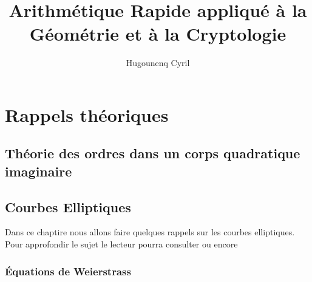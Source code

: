\documentclass[10pt,a4paper]{book}
\author{Hugounenq Cyril}
\title{Arithmétique Rapide appliqué à la Géométrie et à la Cryptologie}
\theoremstyle{plain}
\theoremstyle{definition}
\theoremstyle{definition}
\theoremstyle{definition}
\theoremstyle{definition}
\theoremstyle{remark}
\theoremstyle{remark}
\begin{document}
\fancyhf{}%
\fancyhead[L]{\nouppercase\leftmark}%
\fancyhead[R]{}
\fancyfoot[C]{\thepage}%
\fancyfoot[L]{}




\renewcommand{\headrulewidth}{1pt}%
\renewcommand{\headrule}{\hbox to\headwidth{%
  \color{orange}\leaders\hrule height \headrulewidth\hfill}}
  
\renewcommand{\footrulewidth}{1pt}%
\newcommand{\footrulecolor}{blue}


\setlength{\parskip}{-1pt plus 1pt}

\newcommand{\abstracttextfont}{\normalfont}




\normalsize

\mainmatter

\chapter{Rappels théoriques}
\label{cha:Rappels theoriques}


\section{Théorie des ordres dans un corps quadratique imaginaire}

\section{Courbes Elliptiques}

Dans ce chaptire nous allons faire quelques rappels sur les courbes elliptiques. Pour approfondir le sujet le lecteur pourra consulter \cite{Silv1} ou encore \cite{Washington2008}

\subsection{\'Equations de Weierstrass}
\end{document}
